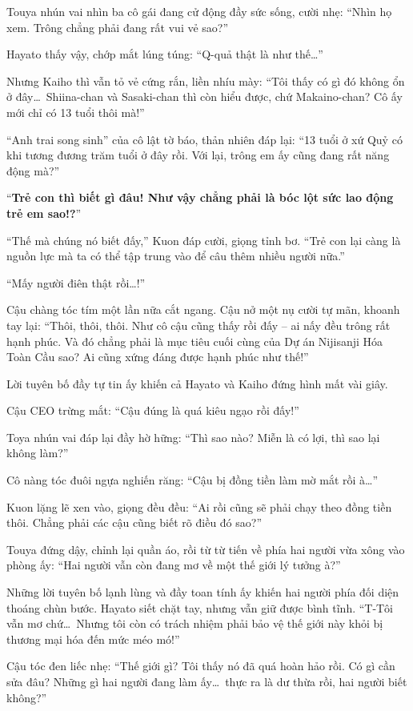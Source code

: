 \documentclass[../main.tex]{subfiles}
\begin{document}
Touya nhún vai nhìn ba cô gái đang cử động đầy sức sống, cười nhẹ: ``Nhìn họ xem. Trông chẳng phải đang rất vui vẻ sao?''

Hayato thấy vậy, chớp mắt lúng túng: ``Q-quả thật là như thế\dots''

Nhưng Kaiho thì vẫn tỏ vẻ cứng rắn, liền nhíu mày: ``Tôi thấy có gì đó không ổn ở đây\dots\ Shiina-chan và Sasaki-chan thì còn hiểu được, chứ Makaino-chan? Cô ấy mới chỉ có 13 tuổi thôi mà!''

``Anh trai song sinh'' của cô lật tờ báo, thản nhiên đáp lại: ``13 tuổi ở xứ Quỷ có khi tương đương trăm tuổi ở đây rồi. Với lại, trông em ấy cũng đang rất năng động mà?''

``\textbf{Trẻ con thì biết gì đâu! Như vậy chẳng phải là bóc lột sức lao động trẻ em sao!?}''

``Thế mà chúng nó biết đấy,'' Kuon đáp cười, giọng tỉnh bơ. ``Trẻ con lại càng là nguồn lực mà ta có thể tập trung vào để câu thêm nhiều người nữa.''

``Mấy người điên thật rồi\dots!''

Cậu chàng tóc tím một lần nữa cắt ngang. Cậu nở một nụ cười tự mãn, khoanh tay lại: ``Thôi, thôi, thôi. Như cô cậu cũng thấy rồi đấy – ai nấy đều trông rất hạnh phúc. Và đó chẳng phải là mục tiêu cuối cùng của Dự án Nijisanji Hóa Toàn Cầu sao? Ai cũng xứng đáng được hạnh phúc như thế!''

Lời tuyên bố đầy tự tin ấy khiến cả Hayato và Kaiho đứng hình mất vài giây.

Cậu CEO trừng mắt: ``Cậu đúng là quá kiêu ngạo rồi đấy!''

Toya nhún vai đáp lại đầy hờ hững: ``Thì sao nào? Miễn là có lợi, thì sao lại không làm?''

Cô nàng tóc đuôi ngựa nghiến răng: ``Cậu bị đồng tiền làm mờ mắt rồi à\dots''

Kuon lặng lẽ xen vào, giọng đều đều: ``Ai rồi cũng sẽ phải chạy theo đồng tiền thôi. Chẳng phải các cậu cũng biết rõ điều đó sao?''

Touya đứng dậy, chỉnh lại quần áo, rồi từ từ tiến về phía hai người vừa xông vào phòng ấy: ``Hai người vẫn còn đang mơ về một thế giới lý tưởng à?''

Những lời tuyên bố lạnh lùng và đầy toan tính ấy khiến hai người phía đối diện thoáng chùn bước. Hayato siết chặt tay, nhưng vẫn giữ được bình tĩnh. ``T-Tôi vẫn mơ chứ\dots\ Nhưng tôi còn có trách nhiệm phải bảo vệ thế giới này khỏi bị thương mại hóa đến mức méo mó!''

Cậu tóc đen liếc nhẹ: ``Thế giới gì? Tôi thấy nó đã quá hoàn hảo rồi. Có gì cần sửa đâu? Những gì hai người đang làm ấy\dots\ thực ra là dư thừa rồi, hai người biết không?''
\end{document}
